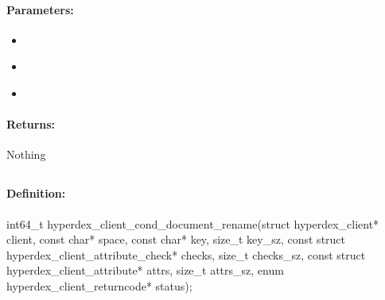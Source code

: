 \paragraph{Parameters:}
\begin{itemize}[noitemsep]
\item {}\\

\item {}\\

\item {}\\

\end{itemize}

\paragraph{Returns:}
Nothing
\pagebreak
\subsection{}
\label{api:c:cond_document_rename}


\paragraph{Definition:}
\begin{ccode}
int64_t hyperdex_client_cond_document_rename(struct hyperdex_client* client,
        const char* space,
        const char* key, size_t key_sz,
        const struct hyperdex_client_attribute_check* checks, size_t checks_sz,
        const struct hyperdex_client_attribute* attrs, size_t attrs_sz,
        enum hyperdex_client_returncode* status);
\end{ccode}

